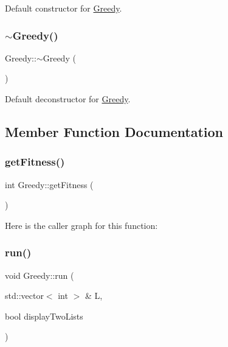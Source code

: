 Default constructor for \hyperlink{class_greedy}{Greedy}. \hypertarget{class_greedy_a0d51cf66b934aec2d1a834ea1c1feb1f}{}\label{class_greedy_a0d51cf66b934aec2d1a834ea1c1feb1f} 
\subsubsection{\texorpdfstring{$\sim$\+Greedy()}{~Greedy()}}
{\footnotesize\ttfamily Greedy\+::$\sim$\+Greedy (\begin{DoxyParamCaption}{ }\end{DoxyParamCaption})}



Default deconstructor for \hyperlink{class_greedy}{Greedy}. 



\subsection{Member Function Documentation}
\hypertarget{class_greedy_a02a3d97f6cc544571aa33376ce9c6ebb}{}\label{class_greedy_a02a3d97f6cc544571aa33376ce9c6ebb} 
\subsubsection{\texorpdfstring{get\+Fitness()}{getFitness()}}
{\footnotesize\ttfamily int Greedy\+::get\+Fitness (\begin{DoxyParamCaption}{ }\end{DoxyParamCaption})\hspace{0.3cm}{\ttfamily [inline]}}

Here is the caller graph for this function\+:
\hypertarget{class_greedy_ac51edbfaebb1e123c887b923be647892}{}\label{class_greedy_ac51edbfaebb1e123c887b923be647892} 
\subsubsection{\texorpdfstring{run()}{run()}}
{\footnotesize\ttfamily void Greedy\+::run (\begin{DoxyParamCaption}\item[{std\+::vector$<$ int $>$ \&}]{L,  }\item[{bool}]{display\+Two\+Lists }\end{DoxyParamCaption})}



